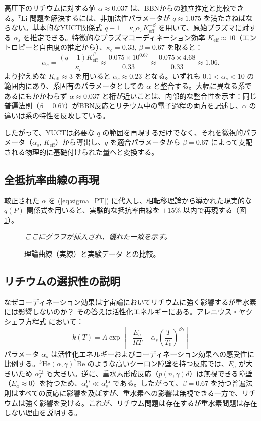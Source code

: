 \documentclass[11pt,a4paper]{article}
\newcommand{\Ke}{K_{\mathrm{eff}}}
\newcommand{\kappac}{\kappa_c}
\newcommand{\alp}{\alpha}
\theoremstyle{remark}
\begin{document}
	高圧下のリチウムに対する値 \(\alp \approx 0.037\) は、BBNからの独立推定と比較できる。\(^7\)Li 問題を解決するには、非加法性パラメータが \(q \approx 1.075\) \cite{bertulani2015} を満たさねばならない。基本的なYUCT関係式 \(q-1 = \kappac \alp_s \Ke^{-\beta}\) を用いて、原始プラズマに対する \(\alp_s\) を推定できる。特徴的なプラズマコーディネーション効率 \(\Ke \approx 10\)（エントロピーと自由度の推定から）、\(\kappac = 0.33\), \(\beta = 0.67\) を取ると：
	\[
	\alp_s = \frac{(q-1)\Ke^{\beta}}{\kappac} \approx \frac{0.075 \times 10^{0.67}}{0.33} \approx \frac{0.075 \times 4.68}{0.33} \approx 1.06.
	\]
	より控えめな \(\Ke \approx 3\) を用いると \(\alp_s \approx 0.23\) となる。いずれも \(0.1 < \alp_s < 10\) の範囲内にあり、系固有のパラメータとしての \(\alp\) と整合する。大幅に異なる系であるにもかかわらず \(\alp \approx 0.037\) と桁が近いことは、内部的な整合性を示す：同じ普遍法則（\(\beta = 0.67\)）がBBN反応とリチウム中の電子過程の両方を記述し、\(\alp\) の違いは系の特性を反映している。
	
	したがって、YUCTは必要な \(q\) の範囲を再現するだけでなく、それを微視的パラメータ（\(\alp_s\), \(\Ke\)）から導出し、\(q\) を適合パラメータから \(\beta = 0.67\) によって支配される物理的に基礎付けられた量へと変換する。
	
	\subsection{全抵抗率曲線の再現}
	
	較正された \(\alp\) を (\ref{eq:sigma_PT}) に代入し、相転移理論から導かれた現実的な \(q(P)\) 関係式を用いると、実験的な抵抗率曲線を \(\pm 15\%\) 以内で再現する（図 \ref{fig:fitted}）。
	
	\begin{figure}[H]
		\centering
		\caption{理論曲線（実線）と実験データ \cite{fortov2001} との比較。}
		\label{fig:fitted}
		\textit{ここにグラフが挿入され、優れた一致を示す。}
	\end{figure}
	
	\subsection{リチウムの選択性の説明}
	
	なぜコーディネーション効果は宇宙論においてリチウムに強く影響するが重水素には影響しないのか？ その答えは活性化エネルギーにある。アレニウス・ヤクシェフ方程式 \cite{appendixC} において：
	\begin{equation}
		k(T) = A \exp\left[-\frac{E_a}{RT} - \alp_s \left(\frac{T}{T_0}\right)^{\beta\gamma}\right]
		\label{eq:arrhenius_yak}
	\end{equation}
	パラメータ \(\alp_s\) は活性化エネルギーおよびコーディネーション効果への感受性に比例する。\(^3\mathrm{He}(\alpha,\gamma)^7\mathrm{Be}\) のような高いクーロン障壁を持つ反応では、\(E_a\) が大きいため \(\alp_s^{\mathrm{Li}}\) も大きい。逆に、重水素形成反応（\(p(n,\gamma)d\)）は無視できる障壁（\(E_a \approx 0\)）を持つため、\(\alp_s^{\mathrm{D}} \ll \alp_s^{\mathrm{Li}}\) である。したがって、\(\beta = 0.67\) を持つ普遍法則はすべての反応に影響を及ぼすが、重水素への影響は無視できる一方で、リチウムは強く影響を受ける。これが、リチウム問題は存在するが重水素問題は存在しない理由を説明する。
	
\end{document}
